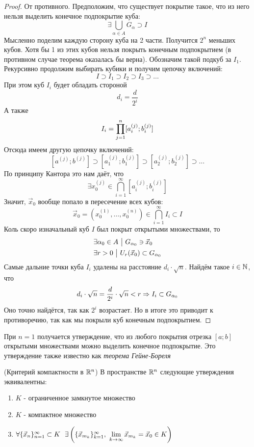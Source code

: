 \begin{proof}
	От противного. Предположим, что существует покрытие такое, что из него нельзя выделить конечное подпокрытие куба:
	\[
		\exists \bigcup\limits_{\alpha \in A} G_\alpha \supset I
	\]
	Мысленно поделим каждую сторону куба на 2 части. Получится $2^n$ меньших кубов. Хотя бы 1 из этих кубов нельзя покрыть конечным подпокрытием (в противном случае теорема оказалась бы верна). Обозначим такой подкуб за $I_1$. Рекурсивно продолжим выбирать кубики и получим цепочку включений:
	\[
		I \supset I_1 \supset I_2 \supset I_3 \supset \ldots
	\]
	При этом куб $I_i$ будет обладать стороной
	\[
		d_i = \frac{d}{2^i}
	\]
	А также
	\[
		I_i = \prod\limits_{j = 1}^n [a_i^{(j)}; b_i^{(j)}]
	\]
	Отсюда имеем другую цепочку включений:
	\[
		[a^{(j)}; b^{(j)}] \supset [a_1^{(j)}; b_1^{(j)}] \supset [a_2^{(j)}; b_2^{(j)}] \supset \ldots
	\]
	По принципу Кантора это нам даёт, что
	\[
		\exists x_0^{(j)} \in \bigcap\limits_{i = 1}^\infty [a_i^{(j)}; b_i^{(j)}]
	\]
	Значит, $\vec{x}_0$ вообще попало в пересечение всех кубов:
	\[
		\vec{x}_0 = (x_0^{(1)}, \ldots, x_0^{(n)}) \in \bigcap\limits_{i = 1}^\infty I_i \subset I
	\]
	Коль скоро изначальный куб $I$ был покрыт открытыми множествами, то
	\begin{align*}
		&{\exists \alpha_0 \in A \ \big|\  G_{\alpha_0} \ni \vec{x}_0}
		\\
		&{\exists r > 0 \ \big|\  U_r(\vec{x}_0) \subset G_{\alpha_0}}
	\end{align*}
	Самые дальние точки куба $I_i$ удалены на расстояние $d_i \cdot \sqrt{n}$. Найдём такое $i \in \mathbb{N}$, что
	\[
		d_i \cdot \sqrt{n} = \frac{d}{2^i} \cdot \sqrt{n} < r \Rightarrow I_i \subset G_{\alpha_0}
	\]
	Оно точно найдётся, так как $2^i$ возрастает. Но в итоге это приводит к противоречию, так как мы покрыли куб конечным подпокрытием.
\end{proof}

\begin{corollary}
	При $n = 1$ получается утверждение, что из любого покрытия отрезка $[a; b]$ открытыми множествами можно выделить конечное подпокрытие. Это утверждение также известно как \textit{теорема Гейне-Бореля}
\end{corollary}

\begin{theorem} (Критерий компактности в $\mathbb{R}^n$)
	В пространстве $\mathbb{R}^n$ следующие утверждения эквивалентны:
	\begin{enumerate}
		\item $K$ - ограниченное замкнутое множество
		
		\item $K$ - компактное множество
		
		\item \(\forall \{\vec{x}_n\}_{n = 1}^\infty \subset K\ \ \exists \left(\{\vec{x}_{m_k}\}_{k = 1}^\infty,\ \lim\limits_{k \to \infty} \vec{x}_{m_k} = \vec{x}_0 \in K \right)\)
	\end{enumerate}
\end{theorem}

